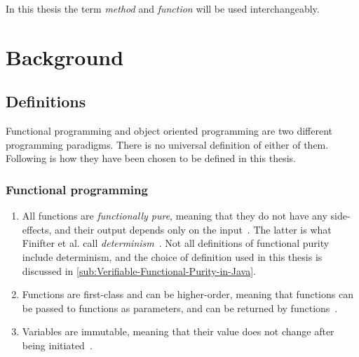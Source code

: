 \documentclass[a4paper,12pt]{article}
\begin{document}

In this thesis the term \textit{method} and \textit{function} will be used interchangeably.


\section{Background} \label{sec:Background} %

\subsection{Definitions} \label{sub:Definitions}
Functional programming and object oriented programming are two different programming paradigms. There is no universal definition of either of them. Following is how they have been chosen to be defined in this thesis.

\subsubsection{Functional programming} \label{sub:functional-programming}

\begin{enumerate}
  \item All functions are \emph{functionally pure}, meaning that they do not have any side-effects, and their output depends only on the input~\cite{john-m-chambers}. The latter is what Finifter et al. call \textit{determinism}~\cite{purity-in-java}. Not all definitions of functional purity include determinism, and the choice of definition used in this thesis is discussed in \autoref{sub:Verifiable-Functional-Purity-in-Java}.
\item Functions are first-class and can be higher-order, meaning that functions can be passed to functions as parameters, and can be returned by functions~\cite{jonas-walter}. %
\item Variables are immutable, meaning that their value does not change after being initiated~\cite{jonas-walter}. %
\end{enumerate}
\end{document}
